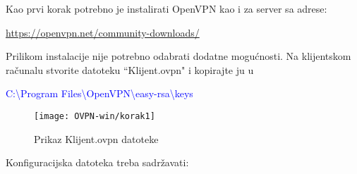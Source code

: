 Kao prvi korak potrebno je instalirati OpenVPN kao i za server sa adrese:\smallbreak

\url{https://openvpn.net/community-downloads/}\smallbreak

Prilikom instalacije nije potrebno odabrati dodatne mogućnosti.\smallbreak
Na klijentskom računalu stvorite datoteku ``Klijent.ovpn" i kopirajte ju u 

\textcolor{blue}{C:\textbackslash Program Files\textbackslash OpenVPN\textbackslash easy-rsa\textbackslash keys}

\begin{figure}[h!]
	\centering
     \texttt{[image: OVPN-win/korak1]}
     \caption{Prikaz Klijent.ovpn datoteke}
\end{figure}
\FloatBarrier

Konfiguracijska datoteka treba sadržavati:\smallbreak
